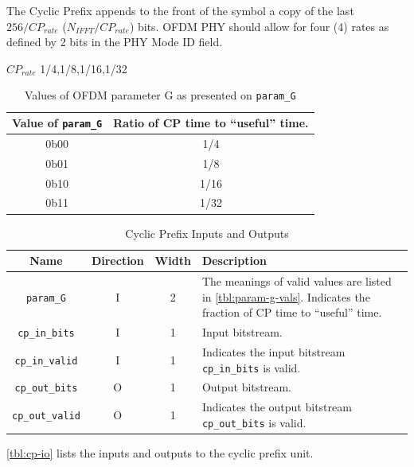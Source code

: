 \documentclass[dvips,10pt,twocolumn]{article}
\begin{document}
	The Cyclic Prefix appends to the front of the symbol a copy of the last
 	$256/CP_{rate}$ ($N_{IFFT}/CP_{rate}$) bits. OFDM PHY should allow for four
	(4) rates as defined by 2 bits in the PHY Mode ID field. 

	$CP_{rate}$ 1/4,1/8,1/16,1/32
	
	
	
	\begin{table}
	\begin{tabulary}{0.5\textwidth}{C|C}
		\label{tbl:param-g-vals}
		Value of \texttt{param\_G} & Ratio of CP time to
		``useful'' time. \\ \hline

		0b00 & 1/4 \\
		0b01 & 1/8 \\
		0b10 & 1/16 \\
		0b11 & 1/32 \\

	\end{tabulary}
	\caption{Values of OFDM parameter G as presented on
	\texttt{param\_G}}
	\end{table}

	\begin{table}
	\begin{tabularx}{\textwidth}{c|c|c|X}
		\label{tbl:cp-io}
		Name & Direction & Width & Description \\ \hline

		\texttt{param\_G} & I & 2 & The meanings of valid values
		are listed in \autoref{tbl:param-g-vals}. Indicates the
		fraction of CP time to ``useful'' time.
		\\

		\texttt{cp\_in\_bits} & I & 1 & Input bitstream. \\
		
		\texttt{cp\_in\_valid} & I & 1 & Indicates the input
		bitstream \texttt{cp\_in\_bits} is valid. \\

		\texttt{cp\_out\_bits} & O & 1 & Output bitstream. \\

		\texttt{cp\_out\_valid} & O & 1 & Indicates the output
		bitstream \texttt{cp\_out\_bits} is valid.
	\end{tabularx}
	\caption{Cyclic Prefix Inputs and Outputs}
	\end{table}

	\autoref{tbl:cp-io} lists the inputs and outputs to the cyclic
	prefix unit.
\end{document}
